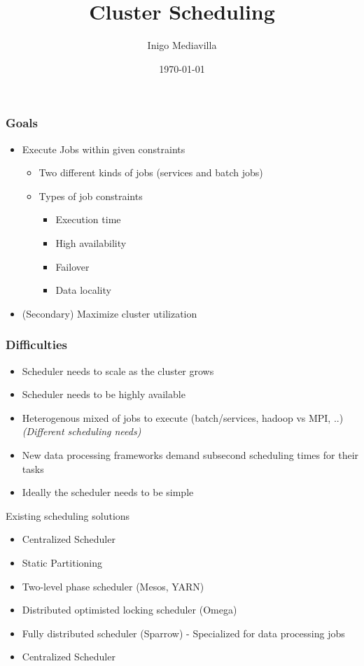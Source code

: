 \documentclass{beamer}
\title{Cluster Scheduling}
\author{Inigo Mediavilla}
\date\today
\begin{document}
  \begin{frame}
    \frametitle{Goals}
    \begin{itemize} 
     \item Execute Jobs within given constraints
       \begin{itemize}
         \item Two different kinds of jobs (services and batch jobs)
         \item Types of job constraints
         \begin{itemize}
           \item Execution time
           \item High availability
           \item Failover
           \item Data locality
         \end{itemize}
       \end{itemize}
     \item (Secondary) Maximize cluster utilization
    \end{itemize}
  \end{frame}
  \begin{frame}
    \frametitle{Difficulties}
    \begin{itemize}
      \item Scheduler needs to scale as the cluster grows
      \item Scheduler needs to be highly available
      \item Heterogenous mixed of jobs to execute 
            (batch/services, hadoop vs MPI, ..)
            \em (Different scheduling needs) 
      \item New data processing frameworks demand subsecond scheduling times for 
            their tasks
      \item Ideally the scheduler needs to be simple
    \end{itemize}
  \end{frame}
  \begin{frame}
    Existing scheduling solutions
    \begin{itemize}
      \item Centralized Scheduler
      \item Static Partitioning
      \item Two-level phase scheduler (Mesos, YARN)
      \item Distributed optimisted locking scheduler (Omega)
      \item Fully distributed scheduler (Sparrow) - Specialized for data processing
            jobs
    \end{itemize}
  \end{frame}
  \begin{frame}
    \begin{itemize}
      \item Centralized Scheduler
    \end{itemize}

  \end{frame}
\end{document}
